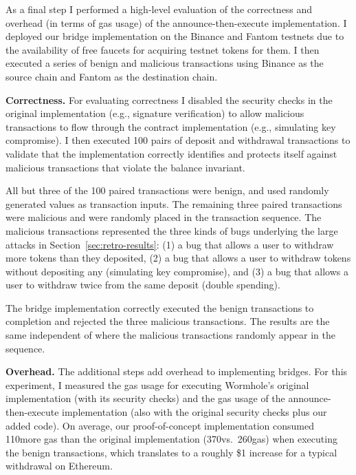 As a final step I performed a high-level evaluation of the
correctness and overhead (in terms of gas usage) of the
announce-then-execute implementation.  I deployed our bridge
implementation on the Binance and Fantom testnets due to the
availability of free faucets for acquiring testnet tokens for them.
I then executed a series of benign and malicious transactions using
Binance as the source chain and Fantom as the destination chain.



\textbf{Correctness.}  For evaluating correctness I disabled the
security checks in the original implementation (e.g., signature
verification) to allow malicious transactions to flow through the
contract implementation (e.g., simulating key compromise).  I then
executed 100 pairs of deposit and withdrawal transactions to validate
that the implementation correctly identifies and protects itself
against malicious transactions that violate the balance invariant.

All but three of the 100 paired transactions were benign, and used
randomly generated values as transaction inputs.
%
The remaining three paired transactions were malicious and were
randomly placed in the transaction sequence.  The malicious
transactions represented the three kinds of bugs underlying the
large attacks in Section~\ref{sec:retro-results}: (1) a bug that
allows a user to withdraw more tokens than they deposited, (2) a bug
that allows a user to withdraw tokens without depositing any
(simulating key compromise), and (3) a bug that allows a user to
withdraw twice from the same deposit (double spending).

The bridge implementation correctly executed the benign transactions
to completion and rejected the three malicious transactions.  The
results are the same independent of where the malicious transactions
randomly appear in the sequence.

\textbf{Overhead.}  The additional steps add overhead to implementing
bridges.  For this experiment, I measured the gas usage for executing
Wormhole's original implementation (with its security checks) and the
gas usage of the announce-then-execute implementation (also with the
original security checks plus our added code).  On average, our
proof-of-concept implementation consumed 110\thou more gas than the
original implementation (370\thou vs.\ 260\thou gas) when
executing the benign transactions, which translates to a
roughly \$1 increase for a typical withdrawal on Ethereum.

